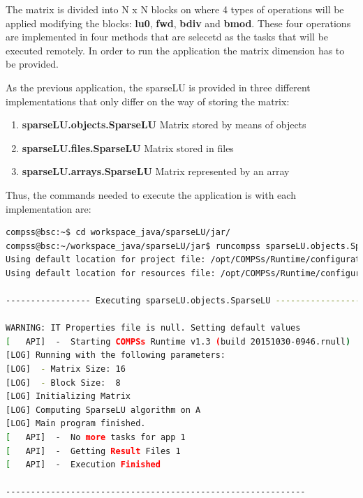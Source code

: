 The matrix is divided into N x N blocks on where 4 types of operations will be applied modifying the blocks: 
{\bf lu0}, {\bf fwd}, {\bf bdiv} and {\bf bmod}. These four operations are implemented in four methods that 
are selecetd as the tasks that will be executed remotely. In order to run the application the matrix dimension 
has to be provided.

As the previous application, the sparseLU is provided in three different implementations that only differ on the way of storing
the matrix:
\begin{enumerate}
 \item \textbf{sparseLU.objects.SparseLU} Matrix stored by means of objects
 \item \textbf{sparseLU.files.SparseLU} Matrix stored in files
 \item \textbf{sparseLU.arrays.SparseLU} Matrix represented by an array
\end{enumerate}

Thus, the commands needed to execute the application is with each implementation are:

\begin{lstlisting}[language=bash]
compss@bsc:~$ cd workspace_java/sparseLU/jar/
compss@bsc:~/workspace_java/sparseLU/jar$ runcompss sparseLU.objects.SparseLU 16 8
Using default location for project file: /opt/COMPSs/Runtime/configuration/xml/projects/project.xml
Using default location for resources file: /opt/COMPSs/Runtime/configuration/xml/resources/resources.xml

----------------- Executing sparseLU.objects.SparseLU --------------------------

WARNING: IT Properties file is null. Setting default values
[   API]  -  Starting COMPSs Runtime v1.3 (build 20151030-0946.rnull)
[LOG] Running with the following parameters:
[LOG]  - Matrix Size: 16
[LOG]  - Block Size:  8
[LOG] Initializing Matrix
[LOG] Computing SparseLU algorithm on A
[LOG] Main program finished.
[   API]  -  No more tasks for app 1
[   API]  -  Getting Result Files 1
[   API]  -  Execution Finished

------------------------------------------------------------
\end{lstlisting}


